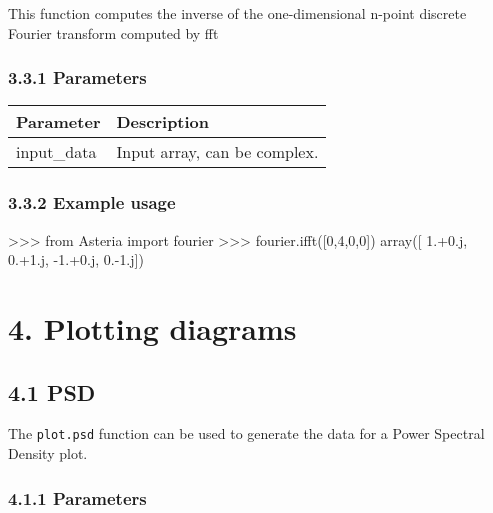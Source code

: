 \documentclass[]{article}
\newenvironment{Shaded}{}{}
\newcommand{\DecValTok}[1]{\textcolor[rgb]{0.25,0.63,0.44}{#1}}
\newcommand{\FloatTok}[1]{\textcolor[rgb]{0.25,0.63,0.44}{#1}}
\newcommand{\ImportTok}[1]{#1}
\newcommand{\OperatorTok}[1]{\textcolor[rgb]{0.40,0.40,0.40}{#1}}
\newcommand{\NormalTok}[1]{#1}
\begin{document}
This function computes the inverse of the one-dimensional n-point
discrete Fourier transform computed by fft

\subsubsection{3.3.1 Parameters}\label{parameters-2}

\begin{longtable}[]{@{}ll@{}}
\toprule
Parameter & Description\tabularnewline
\midrule
\endhead
input\_data & Input array, can be complex.\tabularnewline
\bottomrule
\end{longtable}

\subsubsection{3.3.2 Example usage}\label{example-usage-2}

\begin{Shaded}
\begin{Highlighting}[]
\OperatorTok{>>>} \ImportTok{from}\NormalTok{ Asteria }\ImportTok{import}\NormalTok{ fourier}
\OperatorTok{>>>}\NormalTok{ fourier.ifft([}\DecValTok{0}\NormalTok{,}\DecValTok{4}\NormalTok{,}\DecValTok{0}\NormalTok{,}\DecValTok{0}\NormalTok{])}
\NormalTok{array([ }\DecValTok{1}\NormalTok{.}\OperatorTok{+}\FloatTok{0.}\NormalTok{j,  }\DecValTok{0}\NormalTok{.}\OperatorTok{+}\FloatTok{1.}\NormalTok{j, }\OperatorTok{-}\DecValTok{1}\NormalTok{.}\OperatorTok{+}\FloatTok{0.}\NormalTok{j,  }\DecValTok{0}\NormalTok{.}\OperatorTok{-}\FloatTok{1.}\NormalTok{j])}
\end{Highlighting}
\end{Shaded}

\section{4. Plotting diagrams}\label{plotting-diagrams}

\subsection{4.1 PSD}\label{psd}

The \texttt{plot.psd} function can be used to generate the data for a
Power Spectral Density plot.

\subsubsection{4.1.1 Parameters}\label{parameters-3}
\end{document}
